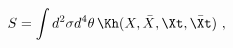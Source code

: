 \begin{equation}
\label{action}
S=\int d^2\sigma d^4\theta \,\Kh(X,\bar{X},\Xt,\bar{\Xt}) \ ,
\end{equation}

